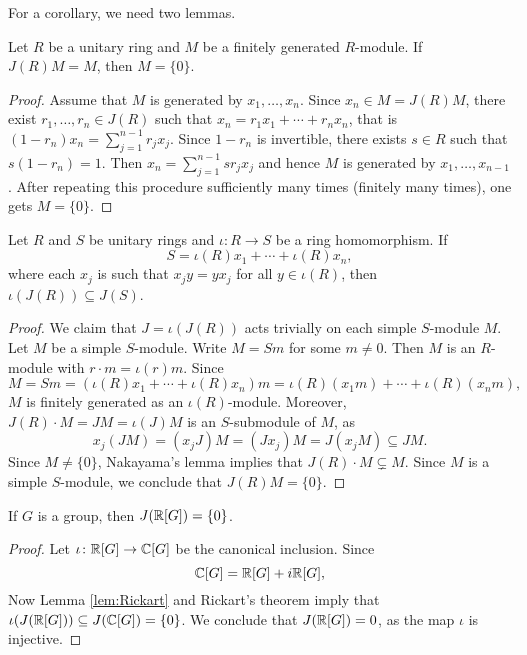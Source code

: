 For a corollary, we need two lemmas. 

\begin{lemma}[Nakayama]
	\label{lem:Nakayama}
	Let $R$ be a unitary ring and $M$ be 
    a finitely generated $R$-module. 
    If $J(R)M=M$, then $M=\{0\}$.
\end{lemma}

\begin{proof}
	Assume that $M$ is generated by 
    $x_1,\dots,x_n$. Since $x_n\in M=J(R)M$, 
	there exist $r_1,\dots,r_n\in J(R)$ such that  $x_n=r_1x_1+\cdots+r_nx_n$, that is 
	$(1-r_n)x_n=\sum_{j=1}^{n-1}r_jx_j$. 
	Since $1-r_n$ is invertible, there exists 
    $s\in R$ such that $s(1-r_n)=1$. Then
	$x_n=\sum_{j=1}^{n-1}sr_jx_j$ 
	and hence $M$ is generated by $x_1,\dots,x_{n-1}$. After repeating this procedure sufficiently many times (finitely many times), one gets $M=\{0\}$.
\end{proof}

\begin{lemma}
	\label{lem:Rickart}
    Let $R$ and $S$ be unitary rings and 
	$\iota\colon R\to S$ be a ring homomorphism. If  
	\[
	S=\iota(R)x_1+\cdots+\iota(R)x_n,
	\]
	where each $x_j$ is such that
    $x_jy=yx_j$ for all $y\in\iota(R)$, then
	$\iota(J(R))\subseteq J(S)$.
\end{lemma}

\begin{proof}
	We claim that $J=\iota(J(R))$ acts trivially on each simple $S$-module $M$.
	Let $M$ be a simple $S$-module. Write 
    $M=Sm$ for some $m\ne0$. Then $M$ is 
    an $R$-module with $r\cdot m=\iota(r)m$. Since 
    \[
		M=Sm=(\iota(R)x_1+\cdots+\iota(R)x_n)m=\iota(R)(x_1m)+\cdots+\iota(R)(x_nm),
	\]
	$M$ is finitely generated as an $\iota(R)$-module. Moreover, $J(R)\cdot
	M=JM=\iota(J)M$ is an $S$-submodule of $M$, as 
	\[
		x_j(JM)=(x_jJ)M=(Jx_j)M=J(x_jM)\subseteq JM.
	\]
	Since $M\ne\{0\}$, Nakayama's lemma implies that $J(R)\cdot M\subsetneq M$. Since 
	$M$ is a simple $S$-module, we conclude that 
    $J(R)M=\{0\}$.
\end{proof}

\begin{corollary}
	If $G$ is a group, then $J(\mathbb{R}[G])=\{0\}$. 
\end{corollary}

\begin{proof}
	Let $\iota\colon \mathbb{R}[G]\to\mathbb{C}[G]$ be the canonical inclusion. Since 
 	\[
	\mathbb{C}[G]=\mathbb{R}[G]+i\mathbb{R}[G],
	\]
	Now Lemma \ref{lem:Rickart} and Rickart's theorem imply that 
	$\iota(J(\mathbb{R}[G]))\subseteq J(\mathbb{C}[G])=\{0\}$. We conclude that $J(\mathbb{R}[G])=0$, as the map $\iota$ is injective. 
\end{proof}
